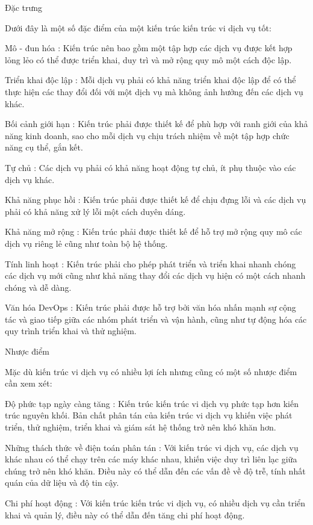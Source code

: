 Đặc trưng

Dưới đây là một số đặc điểm của một kiến trúc kiến trúc vi dịch vụ tốt:

Mô - đun hóa : Kiến trúc nên bao gồm một tập hợp các dịch vụ được kết hợp lỏng lẻo có thể được triển khai, duy trì và mở rộng quy mô một cách độc lập.

Triển khai độc lập : Mỗi dịch vụ phải có khả năng triển khai độc lập để có thể thực hiện các thay đổi đối với một dịch vụ mà không ảnh hưởng đến các dịch vụ khác.

Bối cảnh giới hạn : Kiến trúc phải được thiết kế để phù hợp với ranh giới của khả năng kinh doanh, sao cho mỗi dịch vụ chịu trách nhiệm về một tập hợp chức năng cụ thể, gắn kết.

Tự chủ : Các dịch vụ phải có khả năng hoạt động tự chủ, ít phụ thuộc vào các dịch vụ khác.

Khả năng phục hồi : Kiến trúc phải được thiết kế để chịu đựng lỗi và các dịch vụ phải có khả năng xử lý lỗi một cách duyên dáng.

Khả năng mở rộng : Kiến trúc phải được thiết kế để hỗ trợ mở rộng quy mô các dịch vụ riêng lẻ cũng như toàn bộ hệ thống.

Tính linh hoạt : Kiến trúc phải cho phép phát triển và triển khai nhanh chóng các dịch vụ mới cũng như khả năng thay đổi các dịch vụ hiện có một cách nhanh chóng và dễ dàng.

Văn hóa DevOps : Kiến trúc phải được hỗ trợ bởi văn hóa nhấn mạnh sự cộng tác và giao tiếp giữa các nhóm phát triển và vận hành, cũng như tự động hóa các quy trình triển khai và thử nghiệm.

Nhược điểm

Mặc dù kiến trúc vi dịch vụ có nhiều lợi ích nhưng cũng có một số nhược điểm cần xem xét:

Độ phức tạp ngày càng tăng : Kiến trúc kiến trúc vi dịch vụ phức tạp hơn kiến trúc nguyên khối. Bản chất phân tán của kiến trúc vi dịch vụ khiến việc phát triển, thử nghiệm, triển khai và giám sát hệ thống trở nên khó khăn hơn.

Những thách thức về điện toán phân tán : Với kiến trúc vi dịch vụ, các dịch vụ khác nhau có thể chạy trên các máy khác nhau, khiến việc duy trì liên lạc giữa chúng trở nên khó khăn. Điều này có thể dẫn đến các vấn đề về độ trễ, tính nhất quán của dữ liệu và độ tin cậy.

Chi phí hoạt động : Với kiến trúc kiến trúc vi dịch vụ, có nhiều dịch vụ cần triển khai và quản lý, điều này có thể dẫn đến tăng chi phí hoạt động.

